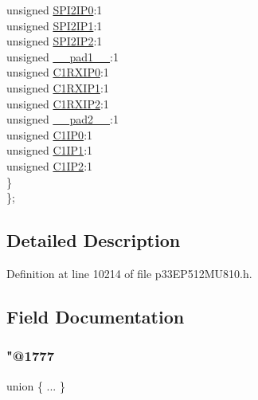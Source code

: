\begin{DoxyCompactItemize}
\begin{tabbing}
\>\>unsigned \hyperlink{structtag_i_p_c8_b_i_t_s_a2c204b760a7ecffee934b3181a1b9ed0}{SPI2IP0}:1\\
\>\>unsigned \hyperlink{structtag_i_p_c8_b_i_t_s_ad9960d93290feee9d568391ed4b68967}{SPI2IP1}:1\\
\>\>unsigned \hyperlink{structtag_i_p_c8_b_i_t_s_a06d7ae778a62ded206c078309bb0e3b8}{SPI2IP2}:1\\
\>\>unsigned \hyperlink{structtag_i_p_c8_b_i_t_s_acaf2d0924a107ec6e8d2e31febaf66f9}{\_\_pad1\_\_}:1\\
\>\>unsigned \hyperlink{structtag_i_p_c8_b_i_t_s_a687a49bf57c47d693a34d0cf2d24c7fb}{C1RXIP0}:1\\
\>\>unsigned \hyperlink{structtag_i_p_c8_b_i_t_s_a2e24f1e500ca6704f2297601fb37126f}{C1RXIP1}:1\\
\>\>unsigned \hyperlink{structtag_i_p_c8_b_i_t_s_a2c7ea2a608aeab4bc644caa5a47501fb}{C1RXIP2}:1\\
\>\>unsigned \hyperlink{structtag_i_p_c8_b_i_t_s_a4d97cc5f7d51d22fc2bf3eab35c9cb7f}{\_\_pad2\_\_}:1\\
\>\>unsigned \hyperlink{structtag_i_p_c8_b_i_t_s_a0475878c7b4a88884b82257f184c2230}{C1IP0}:1\\
\>\>unsigned \hyperlink{structtag_i_p_c8_b_i_t_s_afba0c20edbe593fde77e55da3f47df06}{C1IP1}:1\\
\>\>unsigned \hyperlink{structtag_i_p_c8_b_i_t_s_ac26de5c53b7115baff9596ce3f00b3bb}{C1IP2}:1\\
\>\} \\
\}; \\

\end{tabbing}\end{DoxyCompactItemize}


\subsection{Detailed Description}


Definition at line 10214 of file p33\+E\+P512\+M\+U810.\+h.



\subsection{Field Documentation}
\mbox{\label{structtag_i_p_c8_b_i_t_s_a22242e5f7207c4778df1d57c6c9625ce}} 
\subsubsection{\texorpdfstring{"@1777}{@1777}}
{\footnotesize\ttfamily union \{ ... \} }

